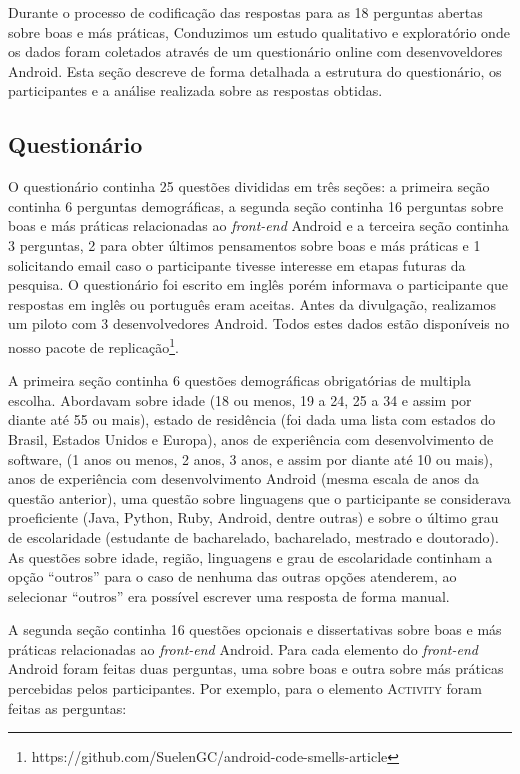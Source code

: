 Durante o processo de codificação das respostas para as 18 perguntas abertas sobre boas e m\'as pr\'aticas, 	
Conduzimos um estudo qualitativo e explorat\'orio onde os dados foram coletados atrav\'es de um question\'ario online com desenvoveldores Android. Esta se\c{c}\~ao descreve de forma detalhada a estrutura do question\'ario, os participantes e a an\'alise realizada sobre as respostas obtidas.

\subsection{Question\'ario}
\label{sub:questionario}

O question\'ario continha 25 quest\~oes divididas em tr\^es se\c{c}\~oes: a primeira se\c{c}\~ao continha 6 perguntas demogr\'aficas, a segunda se\c{c}\~ao continha 16 perguntas sobre boas e m\'as pr\'aticas relacionadas ao \textit{front-end} Android e a terceira se\c{c}\~ao continha 3 perguntas, 2 para obter \'ultimos pensamentos sobre boas e m\'as pr\'aticas e 1 solicitando email caso o participante tivesse interesse em etapas futuras da pesquisa. O question\'ario foi escrito em ingl\^es por\'em informava o participante que respostas em ingl\^es ou portugu\^es eram aceitas. Antes da divulga\c{c}\~ao, realizamos um piloto com 3 desenvolvedores Android. Todos estes dados est\~ao dispon\'iveis no nosso pacote de replica\c{c}\~ao\footnote{https://github.com/SuelenGC/android-code-smells-article}.

A primeira se\c{c}\~ao continha 6 quest\~oes demogr\'aficas obrigat\'orias de multipla escolha. Abordavam sobre idade (18 ou menos, 19 a 24, 25 a 34 e assim por diante at\'e 55 ou mais), estado de resid\^encia (foi dada uma lista com estados do Brasil, Estados Unidos e Europa), anos de experi\^encia com desenvolvimento de software, (1 anos ou menos, 2 anos, 3 anos, e assim por diante at\'e 10 ou mais), anos de experi\^encia com desenvolvimento Android (mesma escala de anos da quest\~ao anterior), uma quest\~ao sobre linguagens que o participante se considerava proeficiente (Java, Python, Ruby, Android, dentre outras) e sobre o \'ultimo grau de escolaridade (estudante de bacharelado, bacharelado, mestrado e doutorado). As quest\~oes sobre idade, regi\~ao, linguagens e grau de escolaridade continham a op\c{c}\~ao ``outros'' para o caso de nenhuma das outras op\c{c}\~oes atenderem, ao selecionar ``outros'' era poss\'ivel escrever uma resposta de forma manual.

A segunda se\c{c}\~ao continha 16 quest\~oes opcionais e dissertativas sobre boas e m\'as pr\'aticas relacionadas ao \textit{front-end} Android. Para cada elemento do \textit{front-end} Android foram feitas duas perguntas, uma sobre boas e outra sobre m\'as pr\'aticas percebidas pelos participantes. Por exemplo, para o elemento \textsc{Activity} foram feitas as perguntas:

